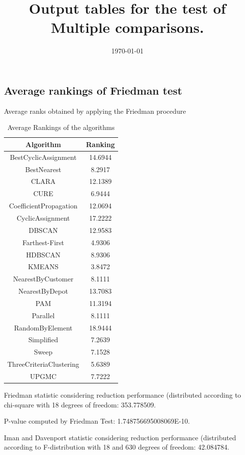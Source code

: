 \documentclass[a4paper,10pt]{article}
\title{Output tables for the test of Multiple comparisons.}
\author{}
\date{\today}
\begin{document}
\begin{landscape}
\pagestyle{empty}
\maketitle
\thispagestyle{empty}
\section{Average rankings of Friedman test}



Average ranks obtained by applying the Friedman procedure

\begin{table}[!htp]
\centering
\begin{tabular}{|c|c|}\hline
Algorithm&Ranking\\\hline
BestCyclicAssignment & 14.6944\\
BestNearest & 8.2917\\
CLARA & 12.1389\\
CURE & 6.9444\\
CoefficientPropagation & 12.0694\\
CyclicAssignment & 17.2222\\
DBSCAN & 12.9583\\
Farthest-First & 4.9306\\
HDBSCAN & 8.9306\\
KMEANS & 3.8472\\
NearestByCustomer & 8.1111\\
NearestByDepot & 13.7083\\
PAM & 11.3194\\
Parallel & 8.1111\\
RandomByElement & 18.9444\\
Simplified & 7.2639\\
Sweep & 7.1528\\
ThreeCriteriaClustering & 5.6389\\
UPGMC & 7.7222\\
\hline
\end{tabular}
\caption{Average Rankings of the algorithms}
\end{table}

Friedman statistic considering reduction performance (distributed according to chi-square with 18 degrees of freedom: 353.778509.

P-value computed by Friedman Test: 1.748756695008069E-10.\newline

Iman and Davenport statistic considering reduction performance (distributed according to F-distribution with 18 and 630 degrees of freedom: 42.084784.


\end{landscape}
\end{document}

